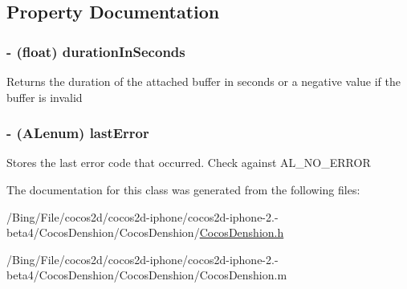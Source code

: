 \subsection{Property Documentation}
\hypertarget{interface_c_d_sound_source_a403933986316e6c2ecc5d7357cece956}{
\subsubsection[{duration\-In\-Seconds}]{\setlength{\rightskip}{0pt plus 5cm}-\/ (float) {\bf duration\-In\-Seconds}}}\label{interface_c_d_sound_source_a403933986316e6c2ecc5d7357cece956}
Returns the duration of the attached buffer in seconds or a negative value if the buffer is invalid \hypertarget{interface_c_d_sound_source_aca348013aabdd95a2bb6aa837c7f74e9}{
\subsubsection[{last\-Error}]{\setlength{\rightskip}{0pt plus 5cm}-\/ (A\-Lenum) {\bf last\-Error}}}\label{interface_c_d_sound_source_aca348013aabdd95a2bb6aa837c7f74e9}
Stores the last error code that occurred. Check against A\-L\-\_\-\-N\-O\-\_\-\-E\-R\-R\-O\-R 

The documentation for this class was generated from the following files\-:\begin{DoxyCompactItemize}
\item 
/\-Bing/\-File/cocos2d/cocos2d-\/iphone/cocos2d-\/iphone-\/2.-\/beta4/\-Cocos\-Denshion/\-Cocos\-Denshion/\hyperlink{_cocos_denshion_8h}{Cocos\-Denshion.\-h}\item 
/\-Bing/\-File/cocos2d/cocos2d-\/iphone/cocos2d-\/iphone-\/2.-\/beta4/\-Cocos\-Denshion/\-Cocos\-Denshion/Cocos\-Denshion.\-m\end{DoxyCompactItemize}
